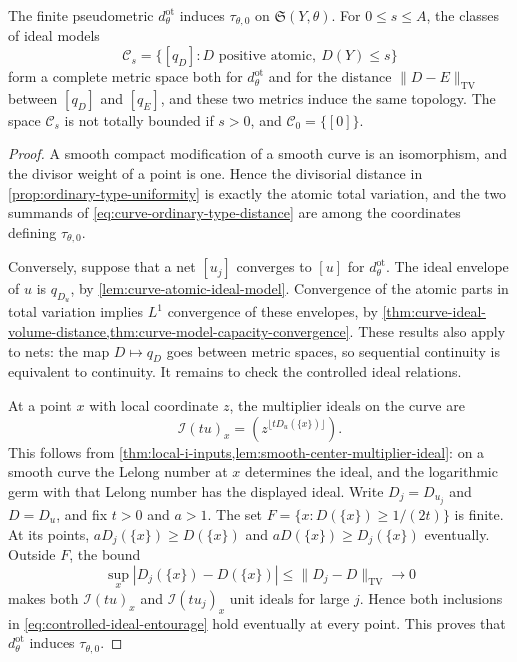 \begin{theorem}\label{thm:curve-ordinary-type-topology}
The finite pseudometric $d^{\mathrm{ot}}_\theta$ induces $\tau_{\theta,0}$ on $\mathfrak S(Y,\theta)$. For $0\leq s\leq A$, the classes of ideal models
\[
 \mathcal C_s=\{[q_D]:D\text{ positive atomic},\ D(Y)\leq s\}
\]
form a complete metric space both for $d^{\mathrm{ot}}_\theta$ and for the distance $\|D-E\|_{\mathrm{TV}}$ between $[q_D]$ and $[q_E]$, and these two metrics induce the same topology. The space $\mathcal C_s$ is not totally bounded if $s>0$, and $\mathcal C_0=\{[0]\}$.
\end{theorem}
\begin{proof}
A smooth compact modification of a smooth curve is an isomorphism, and the divisor weight of a point is one. Hence the divisorial distance in \cref{prop:ordinary-type-uniformity} is exactly the atomic total variation, and the two summands of \eqref{eq:curve-ordinary-type-distance} are among the coordinates defining $\tau_{\theta,0}$.

Conversely, suppose that a net $[u_j]$ converges to $[u]$ for $d^{\mathrm{ot}}_\theta$. The ideal envelope of $u$ is $q_{D_u}$, by \cref{lem:curve-atomic-ideal-model}. Convergence of the atomic parts in total variation implies $L^1$ convergence of these envelopes, by \cref{thm:curve-ideal-volume-distance,thm:curve-model-capacity-convergence}. These results also apply to nets: the map $D\mapsto q_D$ goes between metric spaces, so sequential continuity is equivalent to continuity. It remains to check the controlled ideal relations.

At a point $x$ with local coordinate $z$, the multiplier ideals on the curve are
\[
 \mathcal I(tu)_x=(z^{\lfloor tD_u(\{x\})\rfloor}).
\]
This follows from \cref{thm:local-i-inputs,lem:smooth-center-multiplier-ideal}: on a smooth curve the Lelong number at $x$ determines the ideal, and the logarithmic germ with that Lelong number has the displayed ideal. Write $D_j=D_{u_j}$ and $D=D_u$, and fix $t>0$ and $a>1$. The set $F=\{x:D(\{x\})\geq1/(2t)\}$ is finite. At its points, $aD_j(\{x\})\geq D(\{x\})$ and $aD(\{x\})\geq D_j(\{x\})$ eventually. Outside $F$, the bound
\[
 \sup_x|D_j(\{x\})-D(\{x\})|\leq\|D_j-D\|_{\mathrm{TV}}\longrightarrow0
\]
makes both $\mathcal I(tu)_x$ and $\mathcal I(tu_j)_x$ unit ideals for large $j$. Hence both inclusions in \eqref{eq:controlled-ideal-entourage} hold eventually at every point. This proves that $d^{\mathrm{ot}}_\theta$ induces $\tau_{\theta,0}$.


\end{proof}
